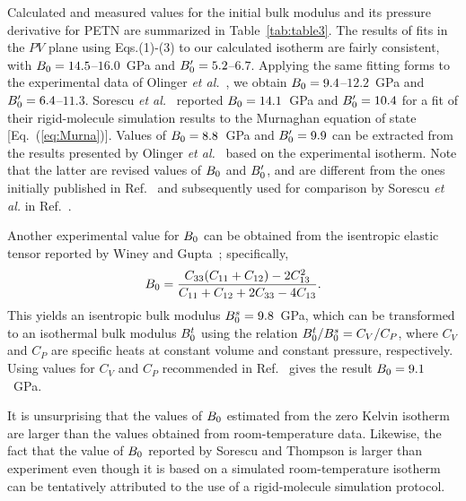 \documentclass[prb,aps,nobibnotes,superbib,preprint]{revtex4}
\begin{document}
Calculated and measured values for the initial bulk modulus and its
pressure derivative for PETN are summarized in Table~\ref{tab:table3}.
The results of fits in the $PV$ plane using Eqs.(1)-(3) to our
calculated isotherm are fairly consistent, with
$B_0=14.5$--$16.0$~GPa and ${B'_0}=5.2$--$6.7$.  Applying the same
fitting forms to the experimental data of Olinger {\it et
al.}~\cite{Olinger_1975v62}, we obtain $B_0=9.4$--$12.2$~GPa and
${B'_0}=6.4$--$11.3$.  Sorescu {\it et al.}~\cite{Sorescu_1999v103}
reported $B_0=14.1$~GPa and ${B'_0}=10.4 $ for a fit of their
rigid-molecule simulation results to the Murnaghan equation of state
[Eq.~(\ref{eq:Murna})].  Values of $B_0=8.8$~GPa and ${B'_0}=9.9$
can be extracted from the results presented by Olinger {\it et
al.}~\cite{Olinger_1976} based on the experimental isotherm. Note that
the latter are revised values of $B_0$ and ${B'_0}$, and are
different from the ones initially published in
Ref.~\cite{Olinger_1975v62} and subsequently used for comparison by
Sorescu {\it et al.}\/ in Ref.~\cite{Sorescu_1999v103}.  

Another experimental value for $B_0$ can be obtained from the isentropic
elastic tensor reported by Winey and Gupta~\cite{Winey_2001v90};
specifically,
\begin{equation}
B_0=\frac{C_{33}(C_{11}+C_{12})-2C_{13}^2}{C_{11}+C_{12}+2C_{33}-4C_{13}}.
\end{equation}
This yields an isentropic bulk modulus $B_0^{s}=9.8$~GPa, which
can be transformed to an isothermal bulk modulus $B_0^t$ using the
relation $B_0^t/B_0^s=C_V/C_P$, where $C_V$ and $C_P$ are specific
heats at constant volume and constant pressure, respectively.  Using
values for $C_V$ and $C_P$ recommended in Ref.~\cite{Olinger_1976}
gives the result $B_0=9.1$~GPa.

It is unsurprising that the values of $B_0$ estimated from the zero
Kelvin isotherm are larger than the values obtained from
room-temperature data.  Likewise, the fact that the value of $B_0$
reported by Sorescu and Thompson is larger than experiment even though
it is based on a simulated room-temperature isotherm can be
tentatively attributed to the use of a rigid-molecule simulation
protocol.
\end{document}
